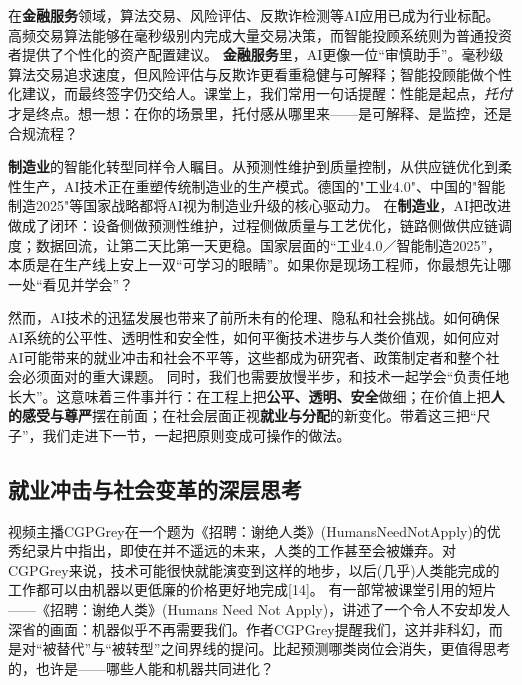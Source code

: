 在{\bf 金融服务}领域，算法交易、风险评估、反欺诈检测等AI应用已成为行业标配。高频交易算法能够在毫秒级别内完成大量交易决策，而智能投顾系统则为普通投资者提供了个性化的资产配置建议。
{\bf 金融服务}里，AI更像一位“审慎助手”。毫秒级算法交易追求速度，但风险评估与反欺诈更看重稳健与可解释；智能投顾能做个性化建议，而最终签字仍交给人。课堂上，我们常用一句话提醒：性能是起点，{\it 托付}才是终点。想一想：在你的场景里，托付感从哪里来——是可解释、是监控，还是合规流程？

{\bf 制造业}的智能化转型同样令人瞩目。从预测性维护到质量控制，从供应链优化到柔性生产，AI技术正在重塑传统制造业的生产模式。德国的"工业4.0"、中国的"智能制造2025"等国家战略都将AI视为制造业升级的核心驱动力。
在{\bf 制造业}，AI把改进做成了闭环：设备侧做预测性维护，过程侧做质量与工艺优化，链路侧做供应链调度；数据回流，让第二天比第一天更稳。国家层面的“工业4.0／智能制造2025”，本质是在生产线上安上一双“可学习的眼睛”。如果你是现场工程师，你最想先让哪一处“看见并学会”？

然而，AI技术的迅猛发展也带来了前所未有的伦理、隐私和社会挑战。如何确保AI系统的公平性、透明性和安全性，如何平衡技术进步与人类价值观，如何应对AI可能带来的就业冲击和社会不平等，这些都成为研究者、政策制定者和整个社会必须面对的重大课题。
同时，我们也需要放慢半步，和技术一起学会“负责任地长大”。这意味着三件事并行：在工程上把{\bf 公平、透明、安全}做细；在价值上把{\bf 人的感受与尊严}摆在前面；在社会层面正视{\bf 就业与分配}的新变化。带着这三把“尺子”，我们走进下一节，一起把原则变成可操作的做法。

\subsection{就业冲击与社会变革的深层思考}

视频主播CGPGrey在一个题为《招聘：谢绝人类》(HumansNeedNotApply)的优秀纪录片中指出，即使在并不遥远的未来，人类的工作甚至会被嫌弃。对CGPGrey来说，技术可能很快就能演变到这样的地步，以后(几乎)人类能完成的工作都可以由机器以更低廉的价格更好地完成[14]。
有一部常被课堂引用的短片——《招聘：谢绝人类》(Humans Need Not Apply)，讲述了一个令人不安却发人深省的画面：机器似乎不再需要我们。作者CGPGrey提醒我们，这并非科幻，而是对“被替代”与“被转型”之间界线的提问。比起预测哪类岗位会消失，更值得思考的，也许是——哪些人能和机器共同进化？

